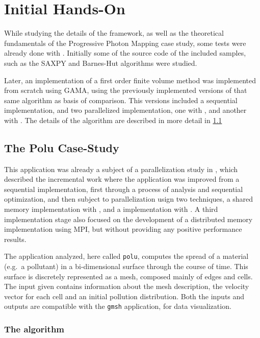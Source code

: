 \documentclass[main.tex]{subfiles}
\begin{document}
\section{Initial \gama Hands-On}

While studying the details of the framework, as well as the theoretical fundamentals of the Progressive Photon Mapping case study, some tests were already done with \gama. Initially some of the source code of the included samples, such as the SAXPY and Barnes-Hut algorithms were studied.

Later, an implementation of a first order finite volume method was implemented from scratch using GAMA, using the previously implemented versions of that same algorithm as basis of comparison. This versions included a sequential implementation, and two parallelized implementation, one with \openmp, and another with \cuda. The details of the algorithm are described in more detail in \cref{sec:polu}

\subsection{The Polu Case-Study} \label{sec:polu}

This application was already a subject of a parallelization study in \cite{naps2012}, which described the incremental work where the application was improved from a sequential implementation, first through a process of analysis and sequential optimization, and then subject to parallelization usign two techniques, a shared memory \cpu implementation with \openmp, and a \gpu implementation with \cuda. A third implementation stage also focused on the development of a distributed memory implementation using \acs{MPI}, but without providing any positive performance results.

The application analyzed, here called \texttt{polu}, computes the spread of a material (e.g.\ a pollutant) in a bi-dimensional surface through the course of time. This surface is discretely represented as a mesh, composed mainly of edges and cells. The input given contains information about the mesh description, the velocity vector for each cell and an initial pollution distribution.
Both the inputs and outputs are compatible with the \texttt{gmsh} application, for data visualization.

\subsubsection{The algorithm}
\end{document}
